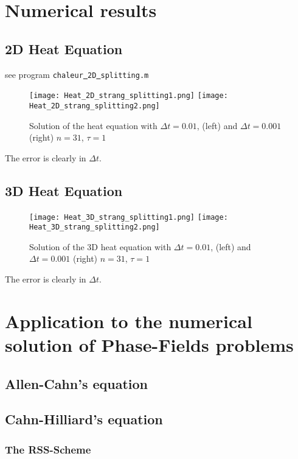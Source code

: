 \documentclass[11pt]{article}
\begin{document}
\section{Numerical results}
\subsection{2D Heat Equation}
see program {\tt chaleur\underline{\ }2D\underline{\ }splitting.m}\\

\begin{figure}[!h]
\begin{center}
\texttt{[image: Heat\_2D\_strang\_splitting1.png]}
\texttt{[image: Heat\_2D\_strang\_splitting2.png]}\\
\caption{Solution of  the heat equation with $\Delta t = 0.01$, (left) and $\Delta t = 0.001$ (right) $n=31$, $\tau=1$}
\label{Strang_splitting_Heat_2D}
\end{center}
\end{figure}
The error is clearly in $\Delta t$.
\subsection{3D Heat Equation}
\begin{figure}[!h]
\begin{center}
\texttt{[image: Heat\_3D\_strang\_splitting1.png]}
\texttt{[image: Heat\_3D\_strang\_splitting2.png]}\\
\caption{Solution of  the 3D heat equation with $\Delta t = 0.01$, (left) and $\Delta t = 0.001$ (right) $n=31$, $\tau=1$}
\label{Strang_splitting_Heat_2D}
\end{center}
\end{figure}
The error is clearly in $\Delta t$.
\section{Application to the numerical solution of Phase-Fields problems}
\subsection{Allen-Cahn's equation}
\subsection{Cahn-Hilliard's equation}
\subsubsection{The RSS-Scheme}
\end{document}
